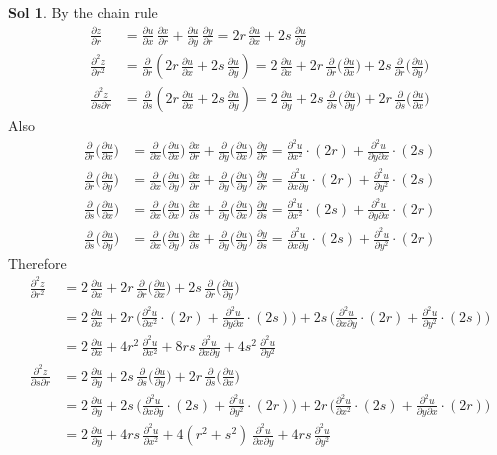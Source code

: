 \documentclass[12pt]{extarticle}
\theoremstyle{definition}
\newtheorem*{sol}{Sol}
\newcommand{\pdiff}[2]{\frac{\partial #1}{\partial #2}}
\newcommand{\pdifft}[2]{\frac{\partial^2 #1}{\partial #2^2}}
\begin{document}
\begin{sol} By the chain rule
  \begin{align*}
    \pdiff{z}{r} &= \pdiff{u}{x}\,\pdiff{x}{r} + \pdiff{u}{y}\,\pdiff{y}{r} = 2r\,\pdiff{u}{x} + 2s\,\pdiff{u}{y} \\
    \pdifft{z}{r} &= \pdiff{}{r}\left(2r\,\pdiff{u}{x} + 2s\,\pdiff{u}{y}\right) = 2\,\pdiff{u}{x} + 2r\,\pdiff{}{r}\bigg(\pdiff{u}{x}\bigg) + 2s\,\pdiff{}{r}\bigg(\pdiff{u}{y}\bigg) \\ 
    \frac{\partial^2 z}{\partial s\partial r} &= \pdiff{}{s}\left(2r\,\pdiff{u}{x} + 2s\,\pdiff{u}{y}\right) = 2\,\pdiff{u}{y} + 2s\,\pdiff{}{s}\bigg(\pdiff{u}{y}\bigg) + 2r\,\pdiff{}{s}\bigg(\pdiff{u}{x}\bigg) 
  \end{align*}
  Also
  \begin{align*}
    \pdiff{}{r}\bigg(\pdiff{u}{x}\bigg) &= \pdiff{}{x}\bigg(\pdiff{u}{x}\bigg)\,\pdiff{x}{r} + \pdiff{}{y}\bigg(\pdiff{u}{x}\bigg)\,\pdiff{y}{r} = \pdifft{u}{x}\cdot(2r) + \frac{\partial^2 u}{\partial y\partial x}\cdot(2s) \\
    \pdiff{}{r}\bigg(\pdiff{u}{y}\bigg) &= \pdiff{}{x}\bigg(\pdiff{u}{y}\bigg)\,\pdiff{x}{r} + \pdiff{}{y}\bigg(\pdiff{u}{y}\bigg)\,\pdiff{y}{r} = \frac{\partial^2 u}{\partial x\partial y}\cdot(2r) + \pdifft{u}{y}\cdot(2s) \\
    \pdiff{}{s}\bigg(\pdiff{u}{x}\bigg) &= \pdiff{}{x}\bigg(\pdiff{u}{x}\bigg)\,\pdiff{x}{s} + \pdiff{}{y}\bigg(\pdiff{u}{x}\bigg)\,\pdiff{y}{s} = \pdifft{u}{x}\cdot(2s) + \frac{\partial^2 u}{\partial y\partial x}\cdot(2r) \\
    \pdiff{}{s}\bigg(\pdiff{u}{y}\bigg) &= \pdiff{}{x}\bigg(\pdiff{u}{y}\bigg)\,\pdiff{x}{s} + \pdiff{}{y}\bigg(\pdiff{u}{y}\bigg)\,\pdiff{y}{s} = \frac{\partial^2 u}{\partial x\partial y}\cdot(2s) + \pdifft{u}{y}\cdot(2r)
  \end{align*}
  Therefore
  \begin{align*}
    \pdifft{z}{r} &= 2\,\pdiff{u}{x} + 2r\,\pdiff{}{r}\bigg(\pdiff{u}{x}\bigg) + 2s\,\pdiff{}{r}\bigg(\pdiff{u}{y}\bigg) \\
    &= 2\,\pdiff{u}{x} + 2r\,\bigg(\pdifft{u}{x}\cdot(2r) + \frac{\partial^2 u}{\partial y\partial x}\cdot(2s)\bigg) + 2s\,\bigg(\frac{\partial^2 u}{\partial x\partial y}\cdot(2r) + \pdifft{u}{y}\cdot(2s)\bigg) \\
    &= 2\,\pdiff{u}{x} + 4r^2\,\pdifft{u}{x} + 8rs\,\frac{\partial^2 u}{\partial x\partial y} + 4s^2\,\pdifft{u}{y} \\
    \frac{\partial^2 z}{\partial s\partial r} &= 2\,\pdiff{u}{y} + 2s\,\pdiff{}{s}\bigg(\pdiff{u}{y}\bigg) + 2r\,\pdiff{}{s}\bigg(\pdiff{u}{x}\bigg) \\
    &= 2\,\pdiff{u}{y} + 2s\,\bigg(\frac{\partial^2 u}{\partial x\partial y}\cdot(2s) + \pdifft{u}{y}\cdot(2r)\bigg) + 2r\,\bigg(\pdifft{u}{x}\cdot(2s) + \frac{\partial^2 u}{\partial y\partial x}\cdot(2r)\bigg) \\
    &= 2\,\pdiff{u}{y} + 4rs\,\pdifft{u}{x} + 4(r^2 + s^2)\,\frac{\partial^2 u}{\partial x\partial y} + 4rs\,\pdifft{u}{y}
  \end{align*}
\end{sol}
\end{document}
